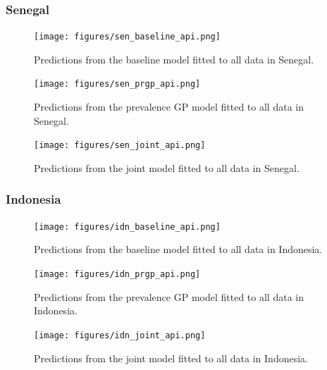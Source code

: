 \documentclass[10pt,a4]{article}
\begin{document}
\subsubsection{Senegal}


\begin{figure}[h!]
\centering

\texttt{[image: figures/sen\_baseline\_api.png]}

\caption{Predictions from the baseline model fitted to all data in Senegal.}
\label{baselinesen}
\end{figure}
\begin{figure}[h!]
\centering

\texttt{[image: figures/sen\_prgp\_api.png]}

\caption{Predictions from the prevalence GP model fitted to all data in Senegal.}
\label{gpsen}
\end{figure}

\begin{figure}[h!]
\centering

\texttt{[image: figures/sen\_joint\_api.png]}

\caption{Predictions from the joint model fitted to all data in Senegal.}
\label{jointsen}
\end{figure}



\subsubsection{Indonesia}


\begin{figure}[h!]
\centering

\texttt{[image: figures/idn\_baseline\_api.png]}

\caption{Predictions from the baseline model fitted to all data in Indonesia.}
\label{baselineidn}
\end{figure}
\begin{figure}[h!]
\centering

\texttt{[image: figures/idn\_prgp\_api.png]}

\caption{Predictions from the prevalence GP model fitted to all data in Indonesia.}
\label{gpidn}
\end{figure}

\begin{figure}[h!]
\centering

\texttt{[image: figures/idn\_joint\_api.png]}

\caption{Predictions from the joint model fitted to all data in Indonesia.}
\label{jointidn}
\end{figure}
\end{document}
